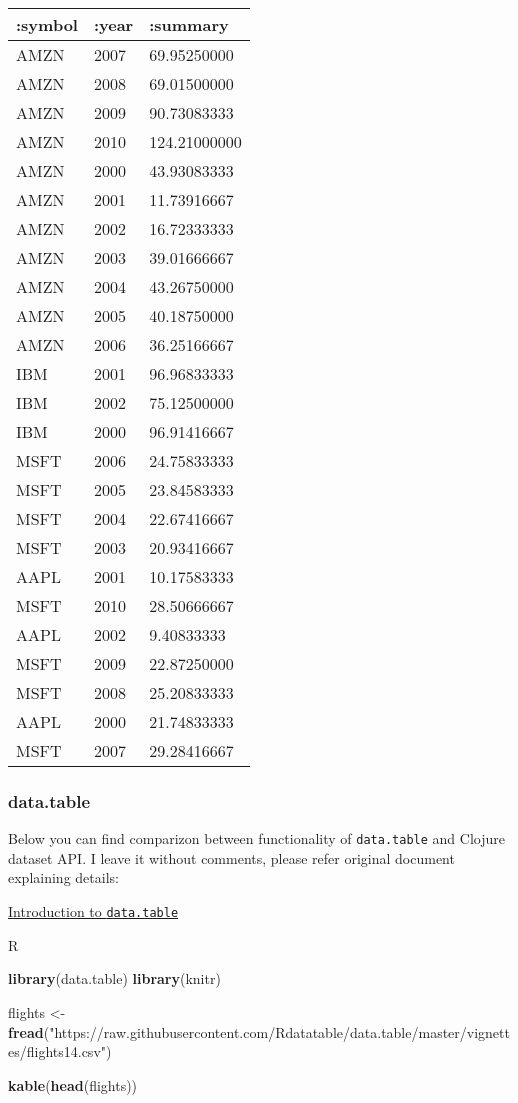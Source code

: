 \documentclass[]{article}
\newenvironment{Shaded}{\begin{snugshade}}{\end{snugshade}}
\newcommand{\KeywordTok}[1]{\textcolor[rgb]{0.13,0.29,0.53}{\textbf{#1}}}
\newcommand{\NormalTok}[1]{#1}
\newcommand{\StringTok}[1]{\textcolor[rgb]{0.31,0.60,0.02}{#1}}
\begin{document}
\begin{longtable}[]{@{}lll@{}}
\toprule
:symbol & :year & :summary\tabularnewline
\midrule
\endhead
AMZN & 2007 & 69.95250000\tabularnewline
AMZN & 2008 & 69.01500000\tabularnewline
AMZN & 2009 & 90.73083333\tabularnewline
AMZN & 2010 & 124.21000000\tabularnewline
AMZN & 2000 & 43.93083333\tabularnewline
AMZN & 2001 & 11.73916667\tabularnewline
AMZN & 2002 & 16.72333333\tabularnewline
AMZN & 2003 & 39.01666667\tabularnewline
AMZN & 2004 & 43.26750000\tabularnewline
AMZN & 2005 & 40.18750000\tabularnewline
AMZN & 2006 & 36.25166667\tabularnewline
IBM & 2001 & 96.96833333\tabularnewline
IBM & 2002 & 75.12500000\tabularnewline
IBM & 2000 & 96.91416667\tabularnewline
MSFT & 2006 & 24.75833333\tabularnewline
MSFT & 2005 & 23.84583333\tabularnewline
MSFT & 2004 & 22.67416667\tabularnewline
MSFT & 2003 & 20.93416667\tabularnewline
AAPL & 2001 & 10.17583333\tabularnewline
MSFT & 2010 & 28.50666667\tabularnewline
AAPL & 2002 & 9.40833333\tabularnewline
MSFT & 2009 & 22.87250000\tabularnewline
MSFT & 2008 & 25.20833333\tabularnewline
AAPL & 2000 & 21.74833333\tabularnewline
MSFT & 2007 & 29.28416667\tabularnewline
\bottomrule
\end{longtable}

\hypertarget{data.table}{%
\subsubsection{data.table}\label{data.table}}

Below you can find comparizon between functionality of
\texttt{data.table} and Clojure dataset API. I leave it without
comments, please refer original document explaining details:

\href{https://rdatatable.gitlab.io/data.table/articles/datatable-intro.html}{Introduction
to \texttt{data.table}}

R

\begin{Shaded}
\begin{Highlighting}[]
\KeywordTok{library}\NormalTok{(data.table)}
\KeywordTok{library}\NormalTok{(knitr)}

\NormalTok{flights <-}\StringTok{ }\KeywordTok{fread}\NormalTok{(}\StringTok{"https://raw.githubusercontent.com/Rdatatable/data.table/master/vignettes/flights14.csv"}\NormalTok{)}

\KeywordTok{kable}\NormalTok{(}\KeywordTok{head}\NormalTok{(flights))}
\end{Highlighting}
\end{Shaded}
\end{document}
